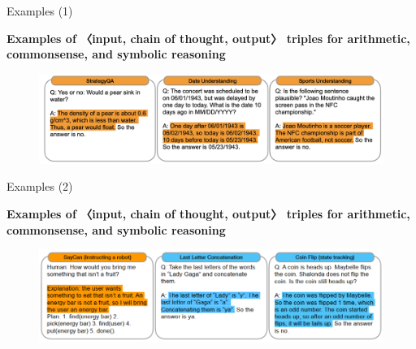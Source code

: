 
\begin{vbframe}{Examples (1)}

\vfill

\textbf{Examples of 〈input, chain of thought, output〉 triples for arithmetic, commonsense, and symbolic reasoning}

\begin{figure}
    \centering
    \includegraphics{figure/cot_examples_1.png}\\
\end{figure}

\vfill

\end{vbframe}


\begin{vbframe}{Examples (2)}

\vfill

\textbf{Examples of 〈input, chain of thought, output〉 triples for arithmetic, commonsense, and symbolic reasoning}

\begin{figure}
    \centering
    \includegraphics{figure/cot_examples_2.png}\\
\end{figure}

\vfill

\end{vbframe}


